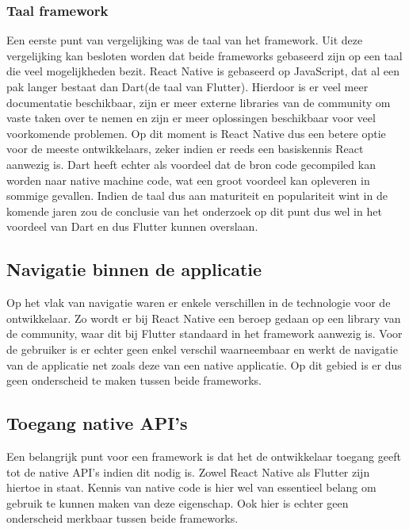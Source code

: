 \subsubsection{Taal framework}

Een eerste punt van vergelijking was de taal van het framework. Uit deze vergelijking kan besloten worden dat beide frameworks gebaseerd zijn op een taal die veel mogelijkheden bezit. React Native is gebaseerd op JavaScript, dat al een pak langer bestaat dan Dart(de taal van Flutter). Hierdoor is er veel meer documentatie beschikbaar, zijn er meer externe libraries van de community om vaste taken over te nemen en zijn er meer oplossingen beschikbaar voor veel voorkomende problemen. Op dit moment is React Native dus een betere optie voor de meeste ontwikkelaars, zeker indien er reeds een basiskennis React aanwezig is. Dart heeft echter als voordeel dat de bron code gecompiled kan worden naar native machine code, wat een groot voordeel kan opleveren in sommige gevallen. Indien de taal dus aan maturiteit en populariteit wint in de komende jaren zou de conclusie van het onderzoek op dit punt dus wel in het voordeel van Dart en dus Flutter kunnen overslaan.

\subsection{Navigatie binnen de applicatie}

Op het vlak van navigatie waren er enkele verschillen in de technologie voor de ontwikkelaar. Zo wordt er bij React Native een beroep gedaan op een library van de community, waar dit bij Flutter standaard in het framework aanwezig is. Voor de gebruiker is er echter geen enkel verschil waarneembaar en werkt de navigatie van de applicatie net zoals deze van een native applicatie. Op dit gebied is er dus geen onderscheid te maken tussen beide frameworks.

\subsection{Toegang native API's}

Een belangrijk punt voor een framework is dat het de ontwikkelaar toegang geeft tot de native API's indien dit nodig is. Zowel React Native als Flutter zijn hiertoe in staat. Kennis van native code is hier wel van essentieel belang om gebruik te kunnen maken van deze eigenschap. Ook hier is echter geen onderscheid merkbaar tussen beide frameworks.

